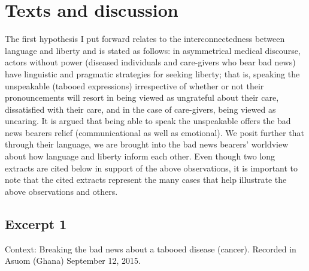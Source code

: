\documentclass[output=paper,colorlinks,citecolor=brown]{langscibook}
\begin{document}
\section{Texts and discussion}\label{sec:obeng:4}

The first hypothesis I put forward relates to the interconnectedness between language and liberty and is stated as follows: in asymmetrical medical discourse, actors without power (diseased individuals and care-givers who bear bad news) have linguistic and pragmatic strategies for seeking liberty; that is, speaking the unspeakable (tabooed expressions) irrespective of whether or not their pronouncements will resort in being viewed as ungrateful about their care, dissatisfied with their care, and in the case of care-givers, being viewed as uncaring. It is argued that being able to speak the unspeakable offers the bad news bearers relief (communicational as well as emotional). We posit further that through their language, we are brought into the bad news bearers’ worldview about how language and liberty inform each other. Even though two long extracts are cited below in support of the above observations, it is important to note that the cited extracts represent the many cases that help illustrate the above observations and others.

\subsection{Excerpt 1}\label{sec:obeng:4.1}
Context: Breaking the bad news about a tabooed disease (cancer). Recorded in Asuom (Ghana) September 12, 2015.

\end{document}
